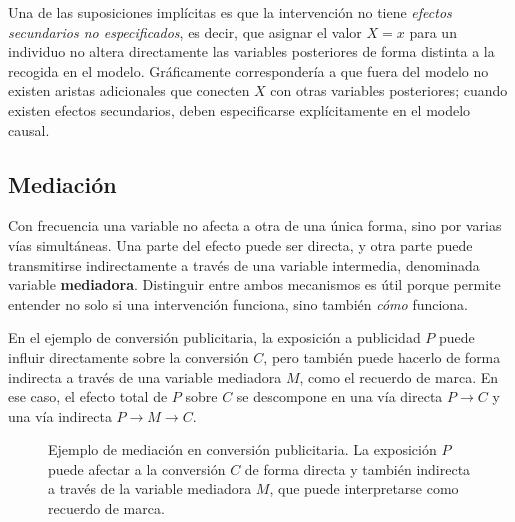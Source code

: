 \documentclass[12pt]{report} %
\begin{document}
Una de las suposiciones implícitas es que la intervención no tiene \textit{efectos secundarios no especificados}, es decir, que asignar el valor $X=x$ para un individuo no altera directamente las variables posteriores de forma distinta a la recogida en el modelo. Gráficamente correspondería a que fuera del modelo no existen aristas adicionales que conecten $X$ con otras variables posteriores; cuando existen efectos secundarios, deben especificarse explícitamente en el modelo causal.

\subsection{Mediación}

Con frecuencia una variable no afecta a otra de una única forma, sino por varias vías simultáneas. Una parte del efecto puede ser directa, y otra parte puede transmitirse indirectamente a través de una variable intermedia, denominada variable \textbf{mediadora}. Distinguir entre ambos mecanismos es útil porque permite entender no solo si una intervención funciona, sino también \textit{cómo} funciona.

En el ejemplo de conversión publicitaria, la exposición a publicidad $P$ puede influir directamente sobre la conversión $C$, pero también puede hacerlo de forma indirecta a través de una variable mediadora $M$, como el recuerdo de marca. En ese caso, el efecto total de $P$ sobre $C$ se descompone en una vía directa $P \to C$ y una vía indirecta $P \to M \to C$.

\begin{figure}[H]
    \centering
    \begingroup
    \shorthandoff{<>}
    \endgroup
    \caption[DAG de mediación publicitaria]{Ejemplo de mediación en conversión publicitaria. La exposición $P$ puede afectar a la conversión $C$ de forma directa y también indirecta a través de la variable mediadora $M$, que puede interpretarse como recuerdo de marca.}
    \label{fig:dag_mediacion_publicidad}
\end{figure}
\end{document}
